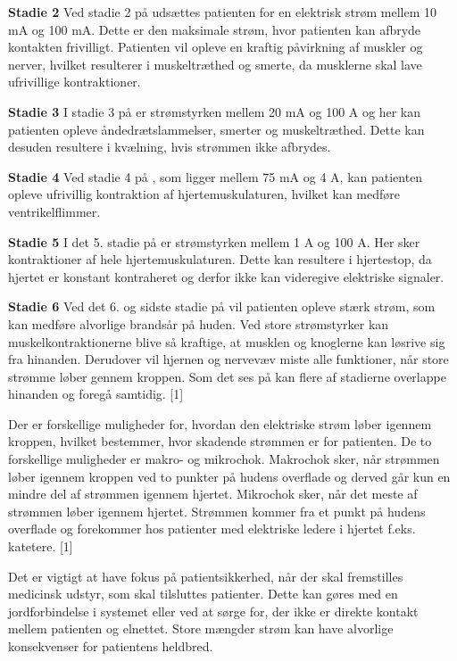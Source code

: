 \textbf{Stadie 2} 
Ved stadie 2 på  udsættes patienten for en elektrisk strøm mellem 10 mA og 100 mA. Dette er den maksimale strøm, hvor patienten kan afbryde kontakten frivilligt. Patienten vil opleve en kraftig påvirkning af muskler og nerver, hvilket resulterer i muskeltræthed og smerte, da musklerne skal lave ufrivillige kontraktioner.
 
 \textbf{Stadie 3}
I stadie 3 på  er strømstyrken mellem 20 mA og 100 A og her kan patienten opleve åndedrætslammelser, smerter og muskeltræthed. Dette kan desuden resultere i kvælning, hvis strømmen ikke afbrydes. 

\textbf{Stadie 4}
Ved stadie 4 på , som ligger mellem 75 mA og 4 A, kan patienten opleve ufrivillig kontraktion af hjertemuskulaturen, hvilket kan medføre ventrikelflimmer. 

\textbf{Stadie 5}
I det 5. stadie på  er strømstyrken mellem 1 A og 100 A. Her sker kontraktioner af hele hjertemuskulaturen. Dette kan resultere i hjertestop, da hjertet er konstant kontraheret og derfor ikke kan videregive elektriske signaler. 

\textbf{Stadie 6}
Ved det 6. og sidste stadie på  vil patienten opleve stærk strøm, som kan medføre alvorlige brandsår på huden. Ved store strømstyrker kan muskelkontraktionerne blive så kraftige, at musklen og knoglerne kan løsrive sig fra hinanden. Derudover vil hjernen og nervevæv miste alle funktioner, når store strømme løber gennem kroppen. Som det ses på  kan flere af stadierne overlappe hinanden og foregå samtidig. [1]

Der er forskellige muligheder for, hvordan den elektriske strøm løber igennem kroppen, hvilket bestemmer, hvor skadende strømmen er for patienten. De to forskellige muligheder er makro- og mikrochok. Makrochok sker, når strømmen løber igennem kroppen ved to punkter på hudens overflade og derved går kun en mindre del af strømmen igennem hjertet. Mikrochok sker, når det meste af strømmen løber igennem hjertet. Strømmen kommer fra et punkt på hudens overflade og forekommer hos patienter med elektriske ledere i hjertet f.eks. katetere. [1]

Det er vigtigt at have fokus på patientsikkerhed, når der skal fremstilles medicinsk udstyr, som skal tilsluttes patienter. Dette kan gøres med en jordforbindelse i systemet eller ved at sørge for, der ikke er direkte kontakt mellem patienten og elnettet. Store mængder strøm kan have alvorlige konsekvenser for patientens heldbred. 


